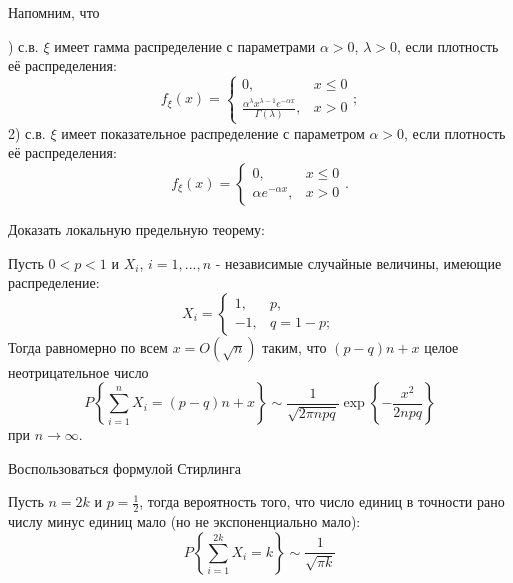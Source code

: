 \begin{problem}
\begin{ordre}
\noindent Напомним, что 

) с.в. $\xi $ имеет гамма распределение с параметрами $\alpha >0$, $\lambda >0$, если плотность её распределения:
\[f_{\xi } (x)=\left\{\begin{array}{cc} {0,} & {x\le 0} \\ {\frac{\alpha ^{\lambda } x^{\lambda -1} e^{-\alpha x} }{\Gamma (\lambda )} ,} & {x>0} \end{array}\right. ;\] 
2) с.в. $\xi $ имеет показательное распределение с параметром $\alpha >0$, если плотность её распределения:
\[f_{\xi } (x)=\left\{\begin{array}{cc} {0,} & {x\le 0} \\ {\alpha e^{-\alpha x} ,} & {x>0} \end{array}\right. .\] 

\end{ordre} 

\end{problem}

\begin{problem}

Доказать локальную предельную теорему:

\noindent Пусть $0<p<1$ и $X_{i} $, $i=1,...,n$ - независимые случайные величины, имеющие распределение:
\[X_{i} =\left\{\begin{array}{cc} {1,} & {p,} \\ {-1,} & {q=1-p;} \end{array}\right. \] 
Тогда равномерно по всем $x=O\left(\sqrt{n} \right)$ таким, что $(p-q)n+x$ целое неотрицательное число
\[P\left\{\sum _{i=1}^{n}X_{i} =(p-q)n+x \right\}\sim \frac{1}{\sqrt{2\pi npq} } \exp \left\{-\frac{x^{2} }{2npq} \right\}\] 
при $n\to \infty $. 

\begin{ordre}
Воспользоваться формулой Стирлинга
\end{ordre}

\begin{remark}
Пусть $n=2k$ и $p=\frac{1}{2} $, тогда вероятность того, что число единиц в точности рано числу минус единиц мало (но не экспоненциально мало):
\[P\left\{\sum _{i=1}^{2k}X_{i} =k \right\}\sim \frac{1}{\sqrt{\pi k} } \] 
\end{remark}


\end{problem}

